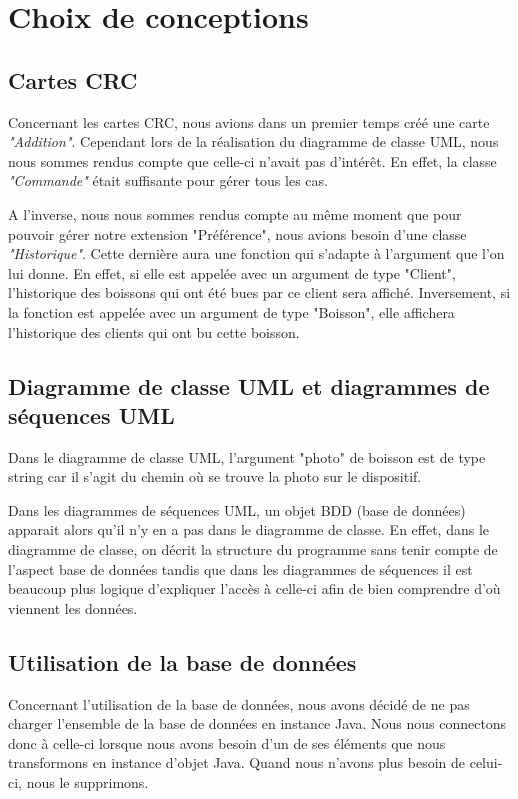 \documentclass[11pt, a4, oneside, headings=normal]{scrreprt}
\begin{document}
\section*{Choix de conceptions}

\subsection*{Cartes CRC}

Concernant les cartes CRC, nous avions dans un premier temps créé une carte \textit{"Addition"}. Cependant lors de la réalisation du diagramme de classe UML, nous nous sommes rendus compte que celle-ci n'avait pas d'intérêt. En effet, la classe \textit{"Commande"} était suffisante pour gérer tous les cas.

A l'inverse, nous nous sommes rendus compte au même moment que pour pouvoir gérer notre extension "Préférence", nous avions besoin d'une classe \textit{"Historique"}. Cette dernière aura une fonction qui s'adapte à l'argument que l'on lui donne. En effet, si elle est appelée avec un argument de type "Client", l'historique des boissons qui ont été bues par ce client sera affiché. Inversement, si la fonction est appelée avec un argument de type "Boisson", elle affichera l'historique des clients qui ont bu cette boisson.

\subsection*{Diagramme de classe UML et diagrammes de séquences UML}

Dans le diagramme de classe UML, l'argument "photo" de boisson est de type string car il s'agit du chemin où se trouve la photo sur le dispositif.

Dans les diagrammes de séquences UML, un objet BDD (base de données) apparait alors qu'il n'y en a pas dans le diagramme de classe.
En effet, dans le diagramme de classe, on décrit la structure du programme sans tenir compte de l'aspect base de données tandis que dans les diagrammes de séquences il est beaucoup plus logique d'expliquer l'accès à celle-ci afin de bien comprendre d'où viennent les données.

\subsection*{Utilisation de la base de données}

Concernant l'utilisation de la base de données, nous avons décidé de ne pas charger l'ensemble de la base de données en instance Java. Nous nous connectons donc à celle-ci lorsque nous avons besoin d'un de ses éléments que nous transformons en instance d'objet Java. Quand nous n'avons plus besoin de celui-ci, nous le supprimons.
\end{document}
